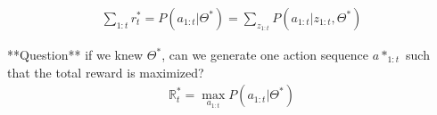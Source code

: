 \documentclass[a4paper,12pt]{article}
\begin{document}
\begin{align}
\sum_{1:t} r^*_t = P(a_{1:t} | \Theta^*) = \sum_{z_{1:t}} P(a_{1:t} | z_{1:t},  \Theta^*) 
\end{align} 

**Question** if we knew $\Theta^*$, can we generate one action sequence $a*_{1:t}$ such that the total reward is maximized? 
\begin{align}
{\mathbb R}^*_t = \max_{a_{1:t}} P(a_{1:t} | \Theta^*)
\end{align} 

%
%
%
%
%
%
%
%
%

{


}
\end{document}
